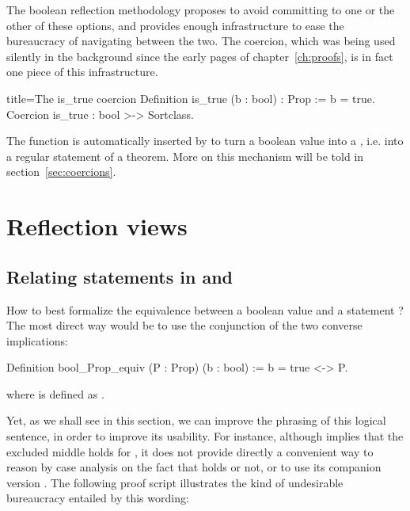 The boolean reflection methodology proposes to avoid
committing to one or the other of these options, and provides enough
infrastructure to ease the bureaucracy of navigating between the two.
The  coercion, which was being used silently in the
background since the early pages of chapter~\ref{ch:proofs}, is in
fact one piece of this infrastructure.

\begin{coq}{}{title=The is\_true coercion}
Definition is_true (b : bool) : Prop := b = true.
Coercion is_true : bool >-> Sortclass.
\end{coq}
The  function is automatically inserted by \Coq{} to
turn a boolean value into a , i.e. into a regular statement
of a theorem.
More on this mechanism will be told in section~\ref{sec:coercions}.


\section{Reflection views}\label{sec:views}

\subsection{Relating statements in  and }\label{ssec:boolProp}

How to best formalize the equivalence between a boolean value 
and a statement ? The most direct way would be to use the
conjunction of the two converse implications:

\begin{coq}{}{}
Definition bool_Prop_equiv (P : Prop) (b : bool) := b = true <-> P.
\end{coq}
where  is defined as .

Yet, as we shall see in this section, we can improve the phrasing of
this logical sentence, in order to improve its usability. For
instance, although  implies that the excluded
middle holds for , it does not provide directly a convenient way
to reason by case analysis on the fact that  holds or not, or to
use its companion version . The following proof
script illustrates the kind of undesirable bureaucracy entailed by
this wording:

